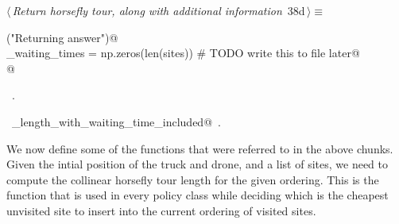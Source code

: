 \documentclass[11.5pt]{report}
\begin{document}
\begin{flushleft} \small\label{scrap54}\raggedright\small
{} $\langle\,${\itshape Return horsefly tour, along with additional information}\nobreak\ {\footnotesize {38d}}$\,\rangle\equiv$
\vspace{-1ex}
\begin{list}{}{} \item
\mbox{}\verb@debug("Returning answer")@\\
\mbox{}\verb@horse_waiting_times = np.zeros(len(sites)) # TODO write this to file later@\\
\mbox{}@\\
\mbox{}\verb@@{\NWsep}
\end{list}
\vspace{-1.5ex}
\footnotesize
\begin{list}{}{\setlength{\itemsep}{-\parsep}\setlength{\itemindent}{-\leftmargin}}
\item \NWtxtMacroRefIn\ .
\item \NWtxtIdentsUsed\nobreak\  \verb@tour_length_with_waiting_time_included@\nobreak\ .
\item{}
\end{list}
\vspace{4ex}
\end{flushleft}

\vspace{-0.8cm}\newchunk We now define some of the functions that were referred to in the above chunks. 
Given the intial position of the truck and drone, and a list of sites, we need to compute 
the collinear horsefly tour length for the given ordering. This is the function that is 
used in every policy class while deciding which is the cheapest unvisited site to insert 
into the current ordering of visited sites. 
\end{document}
